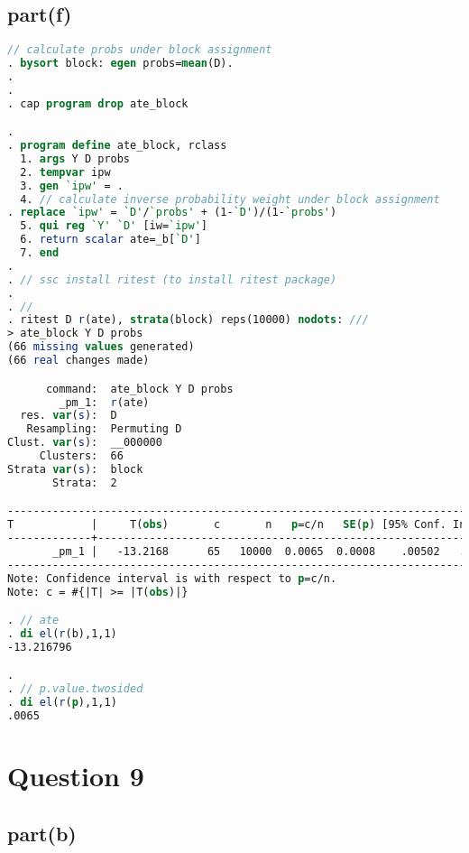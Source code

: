\documentclass[a4paper]{article}
\begin{document}
\subsection*{part(f)}
\begin{lstlisting}[language=stata]
 // calculate probs under block assignment
. bysort block: egen probs=mean(D). 
. 
. 
. cap program drop ate_block

. 
. program define ate_block, rclass
  1. args Y D probs
  2. tempvar ipw
  3. gen `ipw' = .
  4. // calculate inverse probability weight under block assignment
. replace `ipw' = `D'/`probs' + (1-`D')/(1-`probs')
  5. qui reg `Y' `D' [iw=`ipw']
  6. return scalar ate=_b[`D']
  7. end 
. 
. // ssc install ritest (to install ritest package)
. 
. //
. ritest D r(ate), strata(block) reps(10000) nodots: ///
> ate_block Y D probs
(66 missing values generated)
(66 real changes made)

      command:  ate_block Y D probs
        _pm_1:  r(ate)
  res. var(s):  D
   Resampling:  Permuting D
Clust. var(s):  __000000
     Clusters:  66
Strata var(s):  block
       Strata:  2

------------------------------------------------------------------------------
T            |     T(obs)       c       n   p=c/n   SE(p) [95% Conf. Interval]
-------------+----------------------------------------------------------------
       _pm_1 |   -13.2168      65   10000  0.0065  0.0008    .00502   .0082774
------------------------------------------------------------------------------
Note: Confidence interval is with respect to p=c/n.
Note: c = #{|T| >= |T(obs)|}

. // ate
. di el(r(b),1,1)
-13.216796

. 
. // p.value.twosided
. di el(r(p),1,1)
.0065
\end{lstlisting}


\section*{Question 9}
\subsection*{part(b)}
\end{document}
